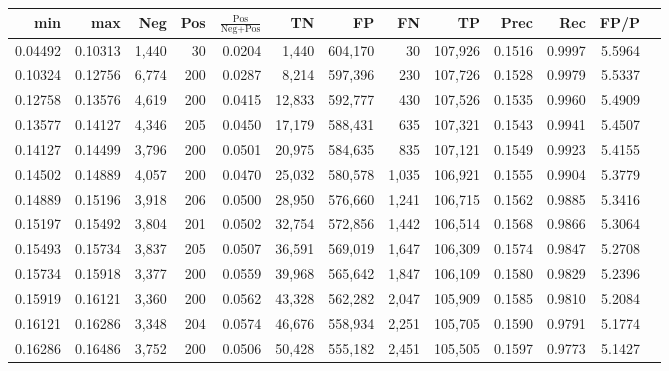 \begin{tabular}{rrrrrrrrrrrrr}
\toprule
    min &     max &   Neg & Pos & $\frac{\text{Pos}}{\text{Neg}+\text{Pos}}$ &      TN &      FP &      FN &      TP &   Prec &    Rec &   FP/P \\
\midrule
0.04492 & 0.10313 & 1,440 &  30 &                                     0.0204 &   1,440 & 604,170 &      30 & 107,926 & 0.1516 & 0.9997 & 5.5964 \\
0.10324 & 0.12756 & 6,774 & 200 &                                     0.0287 &   8,214 & 597,396 &     230 & 107,726 & 0.1528 & 0.9979 & 5.5337 \\
0.12758 & 0.13576 & 4,619 & 200 &                                     0.0415 &  12,833 & 592,777 &     430 & 107,526 & 0.1535 & 0.9960 & 5.4909 \\
0.13577 & 0.14127 & 4,346 & 205 &                                     0.0450 &  17,179 & 588,431 &     635 & 107,321 & 0.1543 & 0.9941 & 5.4507 \\
0.14127 & 0.14499 & 3,796 & 200 &                                     0.0501 &  20,975 & 584,635 &     835 & 107,121 & 0.1549 & 0.9923 & 5.4155 \\
0.14502 & 0.14889 & 4,057 & 200 &                                     0.0470 &  25,032 & 580,578 &   1,035 & 106,921 & 0.1555 & 0.9904 & 5.3779 \\
0.14889 & 0.15196 & 3,918 & 206 &                                     0.0500 &  28,950 & 576,660 &   1,241 & 106,715 & 0.1562 & 0.9885 & 5.3416 \\
0.15197 & 0.15492 & 3,804 & 201 &                                     0.0502 &  32,754 & 572,856 &   1,442 & 106,514 & 0.1568 & 0.9866 & 5.3064 \\
0.15493 & 0.15734 & 3,837 & 205 &                                     0.0507 &  36,591 & 569,019 &   1,647 & 106,309 & 0.1574 & 0.9847 & 5.2708 \\
0.15734 & 0.15918 & 3,377 & 200 &                                     0.0559 &  39,968 & 565,642 &   1,847 & 106,109 & 0.1580 & 0.9829 & 5.2396 \\
0.15919 & 0.16121 & 3,360 & 200 &                                     0.0562 &  43,328 & 562,282 &   2,047 & 105,909 & 0.1585 & 0.9810 & 5.2084 \\
0.16121 & 0.16286 & 3,348 & 204 &                                     0.0574 &  46,676 & 558,934 &   2,251 & 105,705 & 0.1590 & 0.9791 & 5.1774 \\
0.16286 & 0.16486 & 3,752 & 200 &                                     0.0506 &  50,428 & 555,182 &   2,451 & 105,505 & 0.1597 & 0.9773 & 5.1427 \\

\end{tabular}
